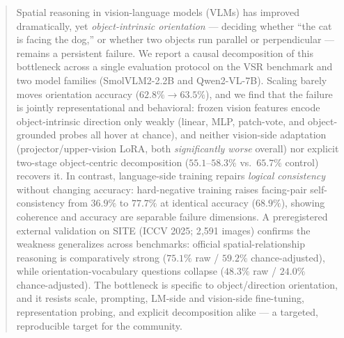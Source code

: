 \begin{abstract}
Spatial reasoning in vision-language models (VLMs) has improved dramatically, yet
\textit{object-intrinsic orientation} --- deciding whether ``the cat is facing the
dog,'' or whether two objects run parallel or perpendicular --- remains a persistent
failure. We report a causal decomposition of this bottleneck across a single
evaluation protocol on the VSR benchmark and two model families (SmolVLM2-2.2B and
Qwen2-VL-7B). Scaling barely moves orientation accuracy ($62.8\% \rightarrow
63.5\%$), and we find that the failure is jointly representational and
behavioral: frozen vision features encode object-intrinsic direction only weakly
(linear, MLP, patch-vote, and object-grounded probes all hover at chance), and
neither vision-side adaptation (projector/upper-vision LoRA, both \emph{significantly
worse} overall) nor explicit two-stage object-centric decomposition ($55.1$--$58.3\%$
vs.\ $65.7\%$ control) recovers it. In contrast, language-side training repairs
\emph{logical consistency} without changing accuracy: hard-negative training raises
facing-pair self-consistency from $36.9\%$ to $77.7\%$ at identical accuracy
($68.9\%$), showing coherence and accuracy are separable failure dimensions. A
preregistered external validation on SITE (ICCV 2025; 2{,}591 images) confirms the
weakness generalizes across benchmarks: official spatial-relationship reasoning is
comparatively strong ($75.1\%$ raw / $59.2\%$ chance-adjusted), while
orientation-vocabulary questions collapse ($48.3\%$ raw / $24.0\%$ chance-adjusted).
The bottleneck is specific to object/direction orientation, and it resists scale,
prompting, LM-side and vision-side fine-tuning, representation probing, and explicit
decomposition alike --- a targeted, reproducible target for the community.
\end{abstract}
